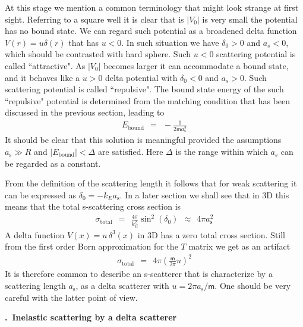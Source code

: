 \documentclass[onecolumn,fleqn, 11pt]{revtex4}
\newcommand{\mass}{\mathsf{m}}
\newcommand{\tbox}[1]{\text{#1}}
\newcommand{\beq}{\begin{eqnarray}}
\newcommand{\eeq}{\end{eqnarray}}
\renewcommand{\thesubsection}{\arabic{subsection}}
\renewcommand{\thesubsubsection}{\arabic{subsubsection}}
\newcommand{\sheadC}[1]
{
\addtocounter{subsubsection}{1}
\vspace{5mm}
{\bf \thesubsection.\thesubsubsection \ #1}  
\nopagebreak
\phantomsection
}
\begin{document}
 
At this stage we mention a common terminology that might 
look strange at first sight. Referring to a square well 
it is clear that is $|V_0|$ is very small the potential 
has no bound state. We can regard such potential as a broadened 
delta function $V(r) = u \delta(r)$ that has ${u<0}$. 
In such situation we have ${\delta_0>0}$ and $a_s<0$, 
which should be contrasted with hard sphere. 
Such ${u<0}$ scattering potential is called ``attractive".
As $|V_0|$ becomes larger it can accommodate 
a bound state, and it behaves like a ${u>0}$
delta potential with ${\delta_0<0}$ and $a_s>0$. 
Such scattering potential is called ``repulsive".
The bound state energy of the such ``repulsive"  
potential is determined from the matching condition
that has been discussed in the previous section, leading to  
\beq
E_{\tbox{bound}} \ \ = \ \ -\frac{1}{2\mass a_{\tbox{s}}^2}
\eeq
It should be clear that this solution is 
meaningful provided the assumptions ${a_{\tbox{s}} \gg R}$ 
and $|E_{\tbox{bound}}|<\Delta$ are satisfied.
Here $\Delta$ is the range within which $a_s$ 
can be regarded as a constant.
 
From the definition of the scattering length 
it follows that for weak scattering it can be 
expressed as ${\delta_0=-k_Ea_{\tbox{s}}}$.
In a later section we shall see that in 3D 
this means that the total s-scattering cross section is 
\beq
\sigma_{\tbox{total}} 
\ \ = \ \ \frac{4\pi}{k_E^2}\sin^2(\delta_0)  
\ \ \approx \ \  4\pi a_{\tbox{s}}^2 
\eeq
A delta function $V(x) = u\,\delta^3(x)$ in 3D has a zero total 
cross section. Still from the first order Born approximation 
for the $T$ matrix we get as an artifact 
\beq
\sigma_{\tbox{total}} \ \ = \ \ 4\pi\left(\frac{\mass}{2\pi}u\right)^2 
\eeq
It is therefore common to describe an s-scatterer 
that is characterize by a scattering length $a_{\tbox{s}}$, 
as a delta scatterer with ${u=2\pi a_{\tbox{s}}/\mass}$.   
One should be very careful with the latter point of view.


\sheadC{Inelastic scattering by a delta scatterer}
\end{document}
